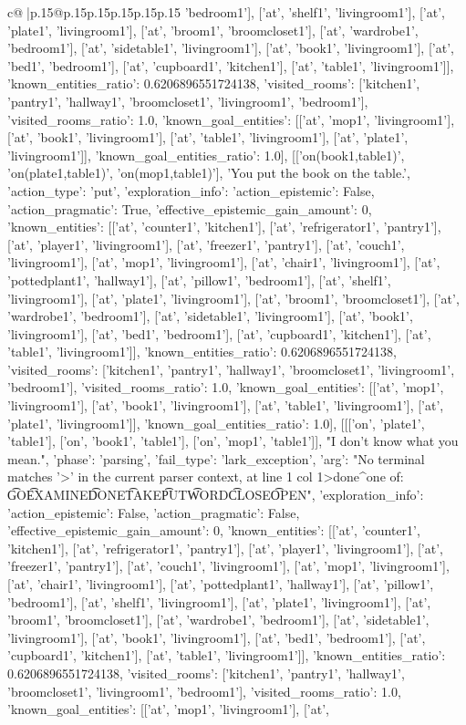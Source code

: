 \documentclass{article}
\begin{document}
{\begin{supertabular}{c@{$\;$}|p{.15\linewidth}@{}p{.15\linewidth}p{.15\linewidth}p{.15\linewidth}p{.15\linewidth}p{.15\linewidth}}
{{{'bedroom1'], ['at', 'shelf1', 'livingroom1'], ['at', 'plate1', 'livingroom1'], ['at', 'broom1', 'broomcloset1'], ['at', 'wardrobe1', 'bedroom1'], ['at', 'sidetable1', 'livingroom1'], ['at', 'book1', 'livingroom1'], ['at', 'bed1', 'bedroom1'], ['at', 'cupboard1', 'kitchen1'], ['at', 'table1', 'livingroom1']], 'known_entities_ratio': 0.6206896551724138, 'visited_rooms': ['kitchen1', 'pantry1', 'hallway1', 'broomcloset1', 'livingroom1', 'bedroom1'], 'visited_rooms_ratio': 1.0, 'known_goal_entities': [['at', 'mop1', 'livingroom1'], ['at', 'book1', 'livingroom1'], ['at', 'table1', 'livingroom1'], ['at', 'plate1', 'livingroom1']], 'known_goal_entities_ratio': 1.0}}], [['on(book1,table1)', 'on(plate1,table1)', 'on(mop1,table1)'], 'You put the book on the table.', {'action_type': 'put', 'exploration_info': {'action_epistemic': False, 'action_pragmatic': True, 'effective_epistemic_gain_amount': 0, 'known_entities': [['at', 'counter1', 'kitchen1'], ['at', 'refrigerator1', 'pantry1'], ['at', 'player1', 'livingroom1'], ['at', 'freezer1', 'pantry1'], ['at', 'couch1', 'livingroom1'], ['at', 'mop1', 'livingroom1'], ['at', 'chair1', 'livingroom1'], ['at', 'pottedplant1', 'hallway1'], ['at', 'pillow1', 'bedroom1'], ['at', 'shelf1', 'livingroom1'], ['at', 'plate1', 'livingroom1'], ['at', 'broom1', 'broomcloset1'], ['at', 'wardrobe1', 'bedroom1'], ['at', 'sidetable1', 'livingroom1'], ['at', 'book1', 'livingroom1'], ['at', 'bed1', 'bedroom1'], ['at', 'cupboard1', 'kitchen1'], ['at', 'table1', 'livingroom1']], 'known_entities_ratio': 0.6206896551724138, 'visited_rooms': ['kitchen1', 'pantry1', 'hallway1', 'broomcloset1', 'livingroom1', 'bedroom1'], 'visited_rooms_ratio': 1.0, 'known_goal_entities': [['at', 'mop1', 'livingroom1'], ['at', 'book1', 'livingroom1'], ['at', 'table1', 'livingroom1'], ['at', 'plate1', 'livingroom1']], 'known_goal_entities_ratio': 1.0}}], [[['on', 'plate1', 'table1'], ['on', 'book1', 'table1'], ['on', 'mop1', 'table1']], "I don't know what you mean.", {'phase': 'parsing', 'fail_type': 'lark_exception', 'arg': "No terminal matches '>' in the current parser context, at line 1 col 1\n\n>done\n^\nExpected one of: \n\t* GO\n\t* EXAMINE\n\t* DONE\n\t* TAKE\n\t* PUT\n\t* WORD\n\t* CLOSE\n\t* OPEN\n", 'exploration_info': {'action_epistemic': False, 'action_pragmatic': False, 'effective_epistemic_gain_amount': 0, 'known_entities': [['at', 'counter1', 'kitchen1'], ['at', 'refrigerator1', 'pantry1'], ['at', 'player1', 'livingroom1'], ['at', 'freezer1', 'pantry1'], ['at', 'couch1', 'livingroom1'], ['at', 'mop1', 'livingroom1'], ['at', 'chair1', 'livingroom1'], ['at', 'pottedplant1', 'hallway1'], ['at', 'pillow1', 'bedroom1'], ['at', 'shelf1', 'livingroom1'], ['at', 'plate1', 'livingroom1'], ['at', 'broom1', 'broomcloset1'], ['at', 'wardrobe1', 'bedroom1'], ['at', 'sidetable1', 'livingroom1'], ['at', 'book1', 'livingroom1'], ['at', 'bed1', 'bedroom1'], ['at', 'cupboard1', 'kitchen1'], ['at', 'table1', 'livingroom1']], 'known_entities_ratio': 0.6206896551724138, 'visited_rooms': ['kitchen1', 'pantry1', 'hallway1', 'broomcloset1', 'livingroom1', 'bedroom1'], 'visited_rooms_ratio': 1.0, 'known_goal_entities': [['at', 'mop1', 'livingroom1'], ['at', }}}
\end{supertabular}}
\end{document}
